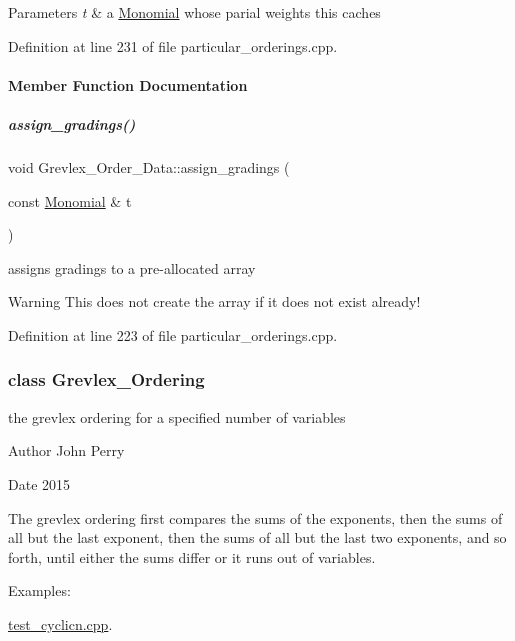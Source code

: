 \begin{DoxyParams}{Parameters}
{\em t} & a \hyperlink{group__polygroup_class_monomial}{Monomial} whose parial weights {\ttfamily this} caches \\
\hline
\end{DoxyParams}


Definition at line 231 of file particular\+\_\+orderings.\+cpp.



\paragraph{Member Function Documentation}
\mbox{\label{group__orderinggroup_aeaf81375ec0b27a6e9c047b1d63c6d55}} 
\subparagraph{\texorpdfstring{assign\+\_\+gradings()}{assign\_gradings()}}
{\footnotesize\ttfamily void Grevlex\+\_\+\+Order\+\_\+\+Data\+::assign\+\_\+gradings (\begin{DoxyParamCaption}\item[{const \hyperlink{group__polygroup_class_monomial}{Monomial} \&}]{t }\end{DoxyParamCaption})}



assigns gradings to a pre-\/allocated array 

\begin{DoxyWarning}{Warning}
This does not create the array if it does not exist already! 
\end{DoxyWarning}


Definition at line 223 of file particular\+\_\+orderings.\+cpp.

\label{class_grevlex___ordering}
\subsubsection{class Grevlex\+\_\+\+Ordering}
the grevlex ordering for a specified number of variables 

\begin{DoxyAuthor}{Author}
John Perry 
\end{DoxyAuthor}
\begin{DoxyDate}{Date}
2015
\end{DoxyDate}
The grevlex ordering first compares the sums of the exponents, then the sums of all but the last exponent, then the sums of all but the last two exponents, and so forth, until either the sums differ or it runs out of variables. \begin{Desc}
\item[Examples\+: ]\par
\hyperlink{test_cyclicn_8cpp-example}{test\+\_\+cyclicn.\+cpp}.\end{Desc}


